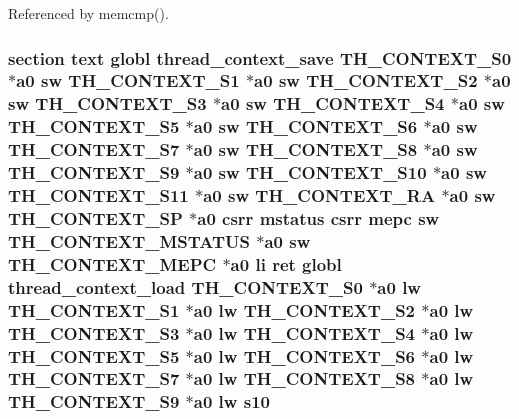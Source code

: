 Referenced by memcmp().

\hypertarget{riscv_2kpanica_8S_ad3038914ac5ce21b87c583b570b158d5}{
\subsubsection[{s10}]{\setlength{\rightskip}{0pt plus 5cm}section text globl {\bf thread\-\_\-context\-\_\-save} {\bf T\-H\-\_\-\-C\-O\-N\-T\-E\-X\-T\-\_\-\-S0} $\ast${\bf a0} {\bf sw} {\bf T\-H\-\_\-\-C\-O\-N\-T\-E\-X\-T\-\_\-\-S1} $\ast${\bf a0} {\bf sw} {\bf T\-H\-\_\-\-C\-O\-N\-T\-E\-X\-T\-\_\-\-S2} $\ast${\bf a0} {\bf sw} {\bf T\-H\-\_\-\-C\-O\-N\-T\-E\-X\-T\-\_\-\-S3} $\ast${\bf a0} {\bf sw} {\bf T\-H\-\_\-\-C\-O\-N\-T\-E\-X\-T\-\_\-\-S4} $\ast${\bf a0} {\bf sw} {\bf T\-H\-\_\-\-C\-O\-N\-T\-E\-X\-T\-\_\-\-S5} $\ast${\bf a0} {\bf sw} {\bf T\-H\-\_\-\-C\-O\-N\-T\-E\-X\-T\-\_\-\-S6} $\ast${\bf a0} {\bf sw} {\bf T\-H\-\_\-\-C\-O\-N\-T\-E\-X\-T\-\_\-\-S7} $\ast${\bf a0} {\bf sw} {\bf T\-H\-\_\-\-C\-O\-N\-T\-E\-X\-T\-\_\-\-S8} $\ast${\bf a0} {\bf sw} {\bf T\-H\-\_\-\-C\-O\-N\-T\-E\-X\-T\-\_\-\-S9} $\ast${\bf a0} {\bf sw} {\bf T\-H\-\_\-\-C\-O\-N\-T\-E\-X\-T\-\_\-\-S10} $\ast${\bf a0} {\bf sw} {\bf T\-H\-\_\-\-C\-O\-N\-T\-E\-X\-T\-\_\-\-S11} $\ast${\bf a0} {\bf sw} {\bf T\-H\-\_\-\-C\-O\-N\-T\-E\-X\-T\-\_\-\-R\-A} $\ast${\bf a0} {\bf sw} {\bf T\-H\-\_\-\-C\-O\-N\-T\-E\-X\-T\-\_\-\-S\-P} $\ast${\bf a0} csrr {\bf mstatus} csrr {\bf mepc} {\bf sw} {\bf T\-H\-\_\-\-C\-O\-N\-T\-E\-X\-T\-\_\-\-M\-S\-T\-A\-T\-U\-S} $\ast${\bf a0} {\bf sw} {\bf T\-H\-\_\-\-C\-O\-N\-T\-E\-X\-T\-\_\-\-M\-E\-P\-C} $\ast${\bf a0} {\bf li} ret globl {\bf thread\-\_\-context\-\_\-load} {\bf T\-H\-\_\-\-C\-O\-N\-T\-E\-X\-T\-\_\-\-S0} $\ast${\bf a0} {\bf lw} {\bf T\-H\-\_\-\-C\-O\-N\-T\-E\-X\-T\-\_\-\-S1} $\ast${\bf a0} {\bf lw} {\bf T\-H\-\_\-\-C\-O\-N\-T\-E\-X\-T\-\_\-\-S2} $\ast${\bf a0} {\bf lw} {\bf T\-H\-\_\-\-C\-O\-N\-T\-E\-X\-T\-\_\-\-S3} $\ast${\bf a0} {\bf lw} {\bf T\-H\-\_\-\-C\-O\-N\-T\-E\-X\-T\-\_\-\-S4} $\ast${\bf a0} {\bf lw} {\bf T\-H\-\_\-\-C\-O\-N\-T\-E\-X\-T\-\_\-\-S5} $\ast${\bf a0} {\bf lw} {\bf T\-H\-\_\-\-C\-O\-N\-T\-E\-X\-T\-\_\-\-S6} $\ast${\bf a0} {\bf lw} {\bf T\-H\-\_\-\-C\-O\-N\-T\-E\-X\-T\-\_\-\-S7} $\ast${\bf a0} {\bf lw} {\bf T\-H\-\_\-\-C\-O\-N\-T\-E\-X\-T\-\_\-\-S8} $\ast${\bf a0} {\bf lw} {\bf T\-H\-\_\-\-C\-O\-N\-T\-E\-X\-T\-\_\-\-S9} $\ast${\bf a0} {\bf lw} s10}}\label{riscv_2kpanica_8S_ad3038914ac5ce21b87c583b570b158d5}
